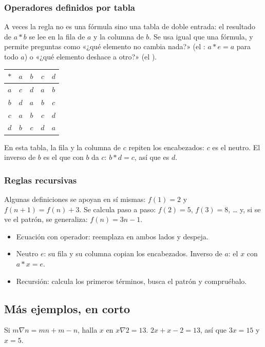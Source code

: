 \subsubsection{Operadores definidos por tabla}
A veces la regla no es una fórmula sino una tabla de doble entrada: el resultado de $a \ast b$ se lee en la fila de $a$
y la columna de $b$. Se usa igual que una fórmula, y permite preguntas como «¿qué elemento no cambia nada?»
(el : $a \ast e = a$ para todo $a$) o «¿qué elemento deshace a otro?» (el ).

\begin{center}
\begin{tabular}{c|cccc}
$\ast$ & $a$ & $b$ & $c$ & $d$\\\hline
$a$ & $c$ & $d$ & $a$ & $b$\\
$b$ & $d$ & $a$ & $b$ & $c$\\
$c$ & $a$ & $b$ & $c$ & $d$\\
$d$ & $b$ & $c$ & $d$ & $a$\\
\end{tabular}
\end{center}

En esta tabla, la fila y la columna de $c$ repiten los encabezados: $c$ es el neutro. El inverso de $b$ es el que
con $b$ da $c$: $b \ast d = c$, así que es $d$.

\subsubsection{Reglas recursivas}
Algunas definiciones se apoyan en sí mismas: $f(1) = 2$ y $f(n + 1) = f(n) + 3$. Se calcula paso a paso: $f(2) = 5$,
$f(3) = 8$, … y, si se ve el patrón, se generaliza: $f(n) = 3n - 1$.

\begin{regla}
\begin{itemize}
  \item Ecuación con operador: reemplaza en ambos lados y despeja.
  \item Neutro $e$: su fila y su columna copian los encabezados. Inverso de $a$: el $x$ con $a \ast x = e$.
  \item Recursión: calcula los primeros términos, busca el patrón y compruébalo.
\end{itemize}
\end{regla}

\subsection{Más ejemplos, en corto}
\begin{ejemplo}[Ecuación]
Si $m \nabla n = mn + m - n$, halla $x$ en $x \nabla 2 = 13$.
\solucion $2x + x - 2 = 13$, así que $3x = 15$ y $x = 5$.
\end{ejemplo}

